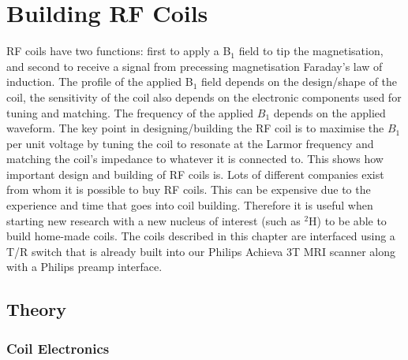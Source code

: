 \chapter{Building RF Coils}

\label{Chap:Coils}

\ac{RF} coils have two functions: first to apply a B$_1$ field to tip the magnetisation, and second to receive a signal from precessing magnetisation Faraday's law of induction. The profile of the applied B$_1$ field depends on the design/shape of the coil, the sensitivity of the coil also depends on the electronic components used for tuning and matching. The frequency of the applied $B_1$ depends on the applied waveform. The key point in designing/building the \ac{RF} coil is to maximise the $B_1$ per unit voltage by tuning the coil to resonate at the Larmor frequency and matching the coil's impedance to whatever it is connected to. This shows how important design and building of \ac{RF} coils is. Lots of different companies exist from whom it is possible to buy \ac{RF} coils. This can be expensive due to the experience and time that goes into coil building. Therefore it is useful when starting new research with a new nucleus of interest (such as $^2$H) to be able to build home-made coils. The coils described in this chapter are interfaced using a T/R switch that is already built into our Philips Achieva 3T \ac{MRI} scanner along with a Philips preamp interface.

\section{Theory}

\subsection{Coil Electronics}




